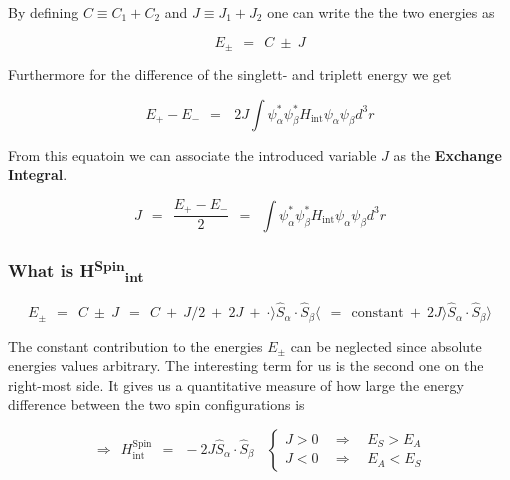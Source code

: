 \documentclass[10pt]{report}
\numberwithin{equation}{chapter}
\begin{document}

By defining $C \equiv C_1+C_2$ and $J \equiv J_1+J_2$ one can write the the two energies as

\begin{equation}
  E_\pm ~~=~~ C ~\pm~ J
\end{equation}

Furthermore for the difference of the singlett- and triplett energy we get

\begin{equation}
  E_+ - E_- ~~=~~~2J \int \psi^*_\alpha \psi^*_\beta H_\text{int} \psi_\alpha \psi_\beta d^3r
\end{equation}

From this equatoin we can associate the introduced variable $J$ as the \textbf{Exchange Integral}.

\begin{equation}
  J ~~=~~ \frac{E_+-E_-}{2} ~~=~~ \int \psi^*_\alpha \psi^*_\beta H_\text{int} \psi_\alpha \psi_\beta d^3r
\end{equation}


\subsubsection{What is H\textsuperscript{Spin}\textsubscript{int}}

\begin{equation}
  E_\pm ~~=~~ C ~\pm~ J ~~=~~ C ~+~ J/2 ~+~ 2J ~+~ \cdot \rangle \hat{S}_\alpha \cdot \hat{S}_\beta \langle ~~=~~ \text{constant} ~+~ 2J \rangle \hat{S}_\alpha \cdot \hat{S}_\beta \rangle
\end{equation}

The constant contribution to the energies $E_\pm$ can be neglected since absolute energies values arbitrary. The interesting term for us is the second one on the right-most side. It gives us a quantitative measure of how large the energy difference between the two spin configurations is

\begin{equation}
  \Rightarrow ~~ H^\text{Spin}_\text{int} ~~=~~ - 2J \hat{S}_\alpha \cdot \hat{S}_\beta ~~~~ \left\{
  \begin{array}{lcr}
    J > 0 & ~~ \Rightarrow ~~ & E_S > E_A\\
    J < 0 & ~~ \Rightarrow ~~ & E_A < E_S
  \end{array}\right.
\end{equation}
\end{document}

